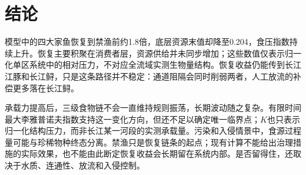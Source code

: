 \section{结论}
模型中的四大家鱼恢复到禁渔前约1.8倍，底层资源末值却降至0.204，食压指数持续上升。恢复主要积聚在消费者层，资源供给并未同步增加；这些数值仅表示归一化单区系统中的相对压力，不对应全流域实测生物量结构。恢复收益仍能传到长江江豚和长江鲟，只是这条路径并不稳定：通道阻隔会同时削弱两者，人工放流的补偿更多落在长江鲟。

承载力提高后，三级食物链不会一直维持规则振荡，长期波动随之复杂。有限时间最大李雅普诺夫指数支持这一变化方向，但还不足以确定唯一临界点；$K$也只表示归一化结构压力，而非长江某一河段的实测承载量。污染和入侵情景中，食源过程量可能与珍稀物种终态分离。禁渔只是恢复链条的起点；现有计算不能给出治理措施的实际效果，也不能由此断定恢复收益会长期留在系统内部。是否留得住，还取决于水质、连通性、放流和入侵控制。

